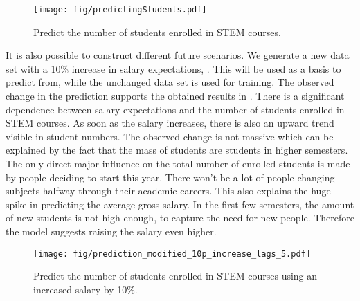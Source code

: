 \documentclass{article}
\theoremstyle{plain}
\theoremstyle{definition}
\theoremstyle{remark}
\begin{document}
\begin{figure}[H]
    \texttt{[image: fig/predictingStudents.pdf]}
    \caption{Predict the number of students enrolled in STEM courses.}
    \label{fig:predict}
\end{figure}

It is also possible to construct different future scenarios.
We generate a new data set with a 10\% increase in salary expectations, .
This will be used as a basis to predict from, while
the unchanged data set is used for training.
The observed change in the prediction supports the obtained results in . There is a significant
dependence between salary expectations and the number of students enrolled in STEM courses. As soon as the salary
increases, there is also an upward trend visible in student numbers. The observed change is not massive which can be explained
by the fact that the mass of students are students in higher semesters. The only direct major influence on
the total number of enrolled students is made by people deciding to start this year. There won't be a lot of people changing subjects
halfway through their academic careers.
This also explains the huge spike in predicting the average gross salary. In the first few semesters,
the amount of new students is not high enough, to capture the need for new people. Therefore the model suggests raising the
salary even higher.


\begin{figure}
    \texttt{[image: fig/prediction\_modified\_10p\_increase\_lags\_5.pdf]}
    \caption{Predict the number of students enrolled in STEM courses using an increased salary by 10\%.}
    \label{fig:altered salary}
\end{figure}


\end{document}
